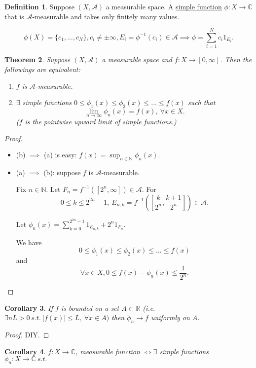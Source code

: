 \documentclass{report}
\newcommand{\R}{\mathbb{R}}
\newcommand{\C}{\mathbb{C}}
\newcommand{\N}{\mathbb{N}}
\newcommand{\st}{\ s.t.\ }
\newcommand{\cA}{\mathcal{A}}
\newtheorem{theorem}{Theorem}[chapter]
\newtheorem{corollary}[theorem]{Corollary}
\theoremstyle{definition}
\newtheorem{definition}[theorem]{Definition}
\theoremstyle{remark}
\begin{document}
\begin{definition}
	Suppose $(X, \mathcal{A})$ a measurable space. A \underline{simple function} $\phi: X \to \C$ that is $\mathcal{A}$-measurable and takes only finitely many values.
\end{definition}
\[
	\phi(X) = \{c_1, \ldots, c_N\}, c_i \neq \pm \infty, E_i = \phi^{-1}(c_i) \in \cA \implies \phi = \sum_{i=1}^N c_i 1_{E_i}.
\]

\begin{theorem}
	Suppose $(X, \cA)$ a measurable space and $f: X \to [0, \infty]$. Then the followings are equivalent:
	\begin{enumerate}
		\item $f$ is $\cA$-measurable.
		\item $\exists$ simple functions $0 \leq \phi_1(x) \leq \phi_2(x) \leq \ldots \leq f(x)$ such that \[\lim_{n \to \infty} \phi_n(x) = f(x),\ \forall x \in X.\] ($f$ is the pointwise upward limit of simple functions.)
	\end{enumerate}
\end{theorem}
\begin{proof}
	\begin{itemize}
		\item (b) $\implies$ (a) is easy: $\displaystyle f(x) = \sup_{n \in \N} \phi_n(x)$.
		\item (a) $\implies$ (b): suppose $f$ is $\cA$-measurable.
		
		Fix $n \in \N$. Let $F_n = f^{-1}([2^n, \infty]) \in \cA$. For
		\[0 \leq k \leq 2^{2n} - 1,\ E_{n, k} = f^{-1}\left(\left[\frac{k}{2^n}, \frac{k+1}{2^n}\right]\right) \in \cA.\]

		Let $\displaystyle \phi_n(x) = \sum_{k=0}^{2^{2n} - 1} 1_{E_{n, k}} + 2^n1_{F_n}$.

		We have \[
			0 \leq \phi_1(x) \leq \phi_2(x) \leq \ldots \leq f(x)\]
		and 
		\[
			\forall x \in X, 0 \leq f(x) - \phi_n(x) \leq \frac{1}{2^n}.\]

	\end{itemize}
\end{proof}

\begin{corollary}
	If $f$ is bounded on a set $A \subset \R$ (i.e. $\exists n L > 0 \st |f(x)| \leq L,\ \forall x \in A)$ then $\phi_n \to f$ uniformly on $A$.
\end{corollary}
\begin{proof}
	DIY.
\end{proof}

\begin{corollary}
	$f: X \to \C$, measurable function $\iff \exists$ simple functions $\phi_n: X \to \C \st $   
\end{corollary}
\end{document}
